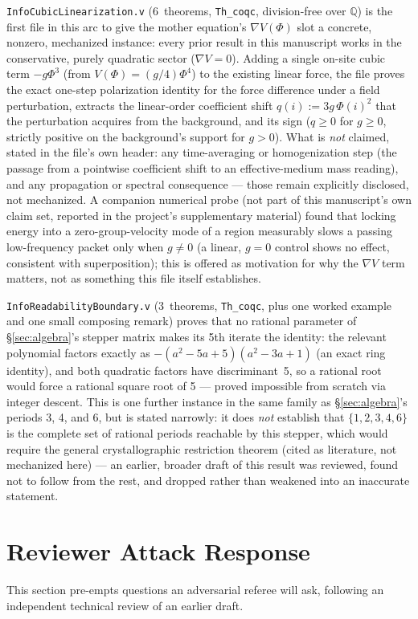 \documentclass[10pt,twocolumn]{article}
\begin{document}
\texttt{InfoCubicLinearization.v} (6~theorems, \texttt{Th\_coqc},
division-free over $\mathbb{Q}$) is the first file in this arc to give the
mother equation's $\nabla V(\Phi)$ slot a concrete, nonzero, mechanized
instance: every prior result in this manuscript works in the conservative,
purely quadratic sector ($\nabla V=0$). Adding a single on-site cubic term
$-g\Phi^3$ (from $V(\Phi)=(g/4)\Phi^4$) to the existing linear force, the
file proves the exact one-step polarization identity for the force
difference under a field perturbation, extracts the linear-order
coefficient shift $q(i):=3g\,\Phi(i)^2$ that the perturbation acquires from
the background, and its sign ($q\ge0$ for $g\ge0$, strictly positive on the
background's support for $g>0$). What is \emph{not} claimed, stated in the
file's own header: any time-averaging or homogenization step (the passage
from a pointwise coefficient shift to an effective-medium mass reading),
and any propagation or spectral consequence --- those remain explicitly
disclosed, not mechanized. A companion numerical probe (not part of this
manuscript's own claim set, reported in the project's supplementary
material) found that locking energy into a zero-group-velocity mode of a
region measurably slows a passing low-frequency packet only when $g\ne0$
(a linear, $g=0$ control shows no effect, consistent with superposition);
this is offered as motivation for why the $\nabla V$ term matters, not as
something this file itself establishes.

\texttt{InfoReadabilityBoundary.v} (3~theorems, \texttt{Th\_coqc}, plus one
worked example and one small composing remark) proves that
no rational parameter of \S\ref{sec:algebra}'s stepper matrix makes its
5th iterate the identity: the relevant polynomial factors exactly as
$-(a^2{-}5a{+}5)(a^2{-}3a{+}1)$ (an exact ring identity), and both
quadratic factors have discriminant~5, so a rational root would force a
rational square root of 5 --- proved impossible from scratch via integer
descent. This is one further instance in the same family as
\S\ref{sec:algebra}'s periods 3, 4, and 6, but is stated narrowly: it does
\emph{not} establish that $\{1,2,3,4,6\}$ is the complete set of rational
periods reachable by this stepper, which would require the general
crystallographic restriction theorem (cited as literature, not mechanized
here) --- an earlier, broader draft of this result was reviewed, found not
to follow from the rest, and dropped rather than weakened into an
inaccurate statement.

\section{Reviewer Attack Response}
\label{sec:attack}
This section pre-empts questions an adversarial referee will ask, following an
independent technical review of an earlier draft.
\end{document}
